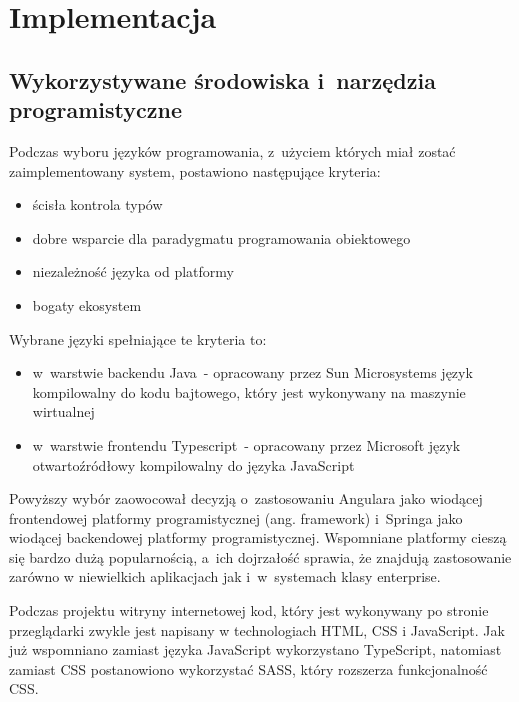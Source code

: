 \chapter{Implementacja}\label{ch:implementation}
\section{Wykorzystywane środowiska i~narzędzia programistyczne}\label{sec:dev-tools}

Podczas wyboru języków programowania, z~użyciem których miał zostać zaimplementowany system, postawiono następujące kryteria:

\begin{itemize}
    \item ścisła kontrola typów
    \item dobre wsparcie dla paradygmatu programowania obiektowego
    \item niezależność języka od platformy
    \item bogaty ekosystem
\end{itemize}

Wybrane języki spełniające te kryteria to:

\begin{itemize}
    \item w~warstwie backendu Java\cite{tech:java}~- opracowany przez Sun Microsystems język kompilowalny do kodu bajtowego, który jest wykonywany na maszynie wirtualnej
    \item w~warstwie frontendu Typescript\cite{tech:typescript}~- opracowany przez Microsoft język otwartoźródłowy kompilowalny do języka JavaScript\cite{tech:javascript}
\end{itemize}

Powyższy wybór zaowocował decyzją o~zastosowaniu Angulara\cite{tech:angular} jako wiodącej frontendowej platformy programistycznej (ang. framework)
i~Springa\cite{tech:spring} jako wiodącej backendowej platformy programistycznej.
Wspomniane platformy cieszą się bardzo dużą popularnością, a~ich dojrzałość sprawia,
że znajdują zastosowanie zarówno w niewielkich aplikacjach jak i~w~systemach klasy enterprise.

\par
Podczas projektu witryny internetowej kod, który jest wykonywany po stronie przeglądarki zwykle jest napisany w technologiach HTML, CSS\cite{tech:html-css} i JavaScript\cite{tech:javascript}.
Jak już wspomniano zamiast języka JavaScript wykorzystano TypeScript, natomiast zamiast CSS postanowiono wykorzystać SASS\cite{tech:sass}, który rozszerza funkcjonalność CSS.

